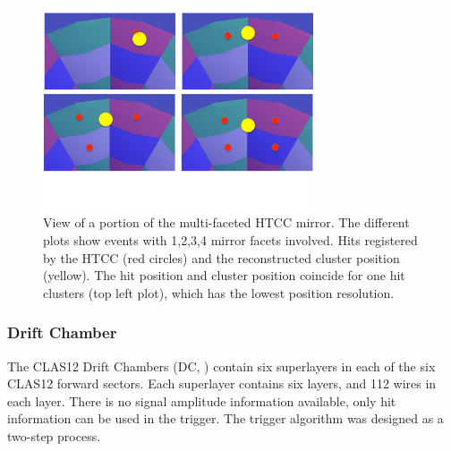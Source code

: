 \begin{figure}[htp]
	\begin{center}
		\centering
		\includegraphics[width=8cm]{img/multiHits.pdf}
		\caption{View of a portion of the multi-faceted HTCC mirror. The different plots show events with 1,2,3,4 mirror facets involved. Hits registered by the HTCC (red circles) and the reconstructed cluster position (yellow). The hit position and cluster position coincide for one hit clusters (top left plot), which has the lowest position resolution.}
		\label{fig:multihitHTCC}
	\end{center}
\end{figure} 


\subsubsection{Drift Chamber}
\label{sec:DC}

The CLAS12 Drift Chambers (DC, \cite{dc-ref}) contain six superlayers in each of the six CLAS12 forward sectors. Each superlayer contains six layers, and 112 wires in each layer. There is no signal amplitude information available, only hit information can be used in the trigger. The trigger algorithm was designed as a two-step process.


